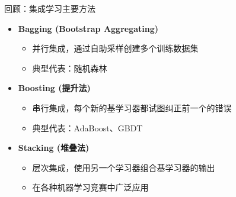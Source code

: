 \documentclass[
  ignorenonframetext,
  aspectratio=169,
  chinese-hans,
]{beamer}
\providecommand{\tightlist}{%
  \setlength{\itemsep}{0pt}\setlength{\parskip}{0pt}}\usepackage{longtable,booktabs,array}
\begin{document}
\begin{frame}{回顾：集成学习主要方法}
\label{ux56deux987eux96c6ux6210ux5b66ux4e60ux4e3bux8981ux65b9ux6cd5}
\begin{itemize}
\tightlist
\item
  \textbf{Bagging (Bootstrap Aggregating)}

  \begin{itemize}
  \tightlist
  \item
    并行集成，通过自助采样创建多个训练数据集
  \item
    典型代表：随机森林
  \end{itemize}
\item
  \textbf{Boosting (提升法)}

  \begin{itemize}
  \tightlist
  \item
    串行集成，每个新的基学习器都试图纠正前一个的错误
  \item
    典型代表：AdaBoost、GBDT
  \end{itemize}
\item
  \textbf{Stacking (堆叠法)}

  \begin{itemize}
  \tightlist
  \item
    层次集成，使用另一个学习器组合基学习器的输出
  \item
    在各种机器学习竞赛中广泛应用
  \end{itemize}
\end{itemize}
\end{frame}
\end{document}
